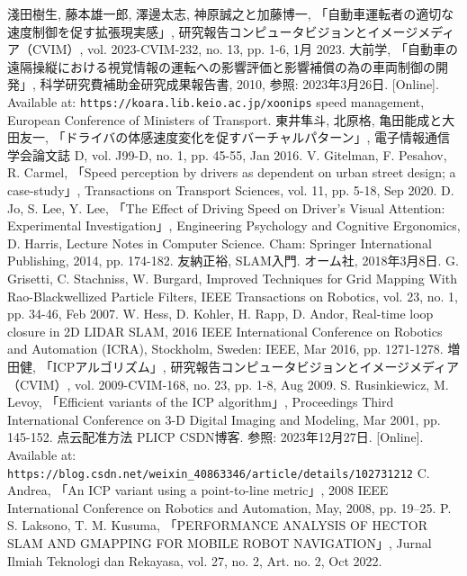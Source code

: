 \documentclass[a4paper,12pt]{jreport}
\begin{document}
\begin{thebibliography}{99}
   淺田樹生, 藤本雄一郎, 澤邊太志, 神原誠之と加藤博一, 「自動車運転者の適切な速度制御を促す拡張現実感」, 研究報告コンピュータビジョンとイメージメディア（CVIM）, vol. 2023-CVIM-232, no. 13, pp. 1-6, 1月 2023.
   大前学, 「自動車の遠隔操縦における視覚情報の運転への影響評価と影響補償の為の車両制御の開発」, 科学研究費補助金研究成果報告書, 2010, 参照: 2023年3月26日. [Online]. Available at: \verb|https://koara.lib.keio.ac.jp/xoonips|
   speed management, European Conference of Ministers of Transport.
   東井隼斗, 北原格, 亀田能成と大田友一, 「ドライバの体感速度変化を促すバーチャルパターン」, 電子情報通信学会論文誌 D, vol. J99-D, no. 1, pp. 45-55, Jan 2016.
   V. Gitelman, F. Pesahov, R. Carmel, 「Speed perception by drivers as dependent on urban street design; a case-study」, Transactions on Transport Sciences, vol. 11, pp. 5-18, Sep 2020.
  D. Jo, S. Lee, Y. Lee, 「The Effect of Driving Speed on Driver's Visual Attention: Experimental Investigation」, Engineering Psychology and Cognitive Ergonomics, D. Harris, Lecture Notes in Computer Science. Cham: Springer International Publishing, 2014, pp. 174-182.
  友納正裕, SLAM入門. オーム社, 2018年3月8日.
  G. Grisetti, C. Stachniss, W. Burgard,  Improved Techniques for Grid Mapping With Rao-Blackwellized Particle Filters, IEEE Transactions on Robotics, vol. 23, no. 1, pp. 34-46, Feb 2007.
  W. Hess, D. Kohler, H. Rapp, D. Andor, Real-time loop closure in 2D LIDAR SLAM, 2016 IEEE International Conference on Robotics and Automation (ICRA), Stockholm, Sweden: IEEE, Mar 2016, pp. 1271-1278.
  増田健, 「ICPアルゴリズム」, 研究報告コンピュータビジョンとイメージメディア（CVIM）, vol. 2009-CVIM-168, no. 23, pp. 1-8, Aug 2009.
  S. Rusinkiewicz, M. Levoy, 「Efficient variants of the ICP algorithm」, Proceedings Third International Conference on 3-D Digital Imaging and Modeling, Mar 2001, pp. 145-152.
  点云配准方法 PLICP CSDN博客. 参照: 2023年12月27日. [Online]. Available at: \verb|https://blog.csdn.net/weixin_40863346/article/details/102731212|
  C. Andrea, 「An ICP variant using a point-to-line metric」, 2008 IEEE International Conference on Robotics and Automation, May, 2008, pp. 19–25.
  P. S. Laksono, T. M. Kusuma, 「PERFORMANCE ANALYSIS OF HECTOR SLAM AND GMAPPING FOR MOBILE ROBOT NAVIGATION」, Jurnal Ilmiah Teknologi dan Rekayasa, vol. 27, no. 2, Art. no. 2, Oct 2022.

\end{thebibliography}
\end{document}
